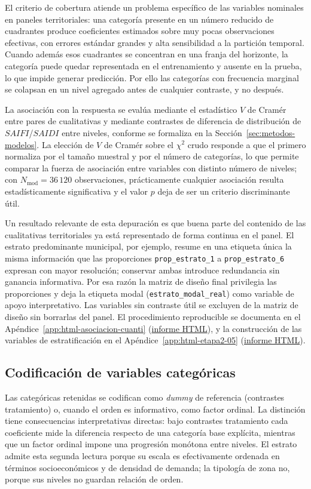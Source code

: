 El criterio de cobertura atiende un problema específico de las variables nominales en paneles territoriales: una categoría presente en un número reducido de cuadrantes produce coeficientes estimados sobre muy pocas observaciones efectivas, con errores estándar grandes y alta sensibilidad a la partición temporal. Cuando además esos cuadrantes se concentran en una franja del horizonte, la categoría puede quedar representada en el entrenamiento y ausente en la prueba, lo que impide generar predicción. Por ello las categorías con frecuencia marginal se colapsan en un nivel agregado antes de cualquier contraste, y no después.

La asociación con la respuesta se evalúa mediante el estadístico $V$ de Cramér entre pares de cualitativas y mediante contrastes de diferencia de distribución de $SAIFI$/$SAIDI$ entre niveles, conforme se formaliza en la Sección~\ref{sec:metodos-modelos}. La elección de $V$ de Cramér sobre el $\chi^2$ crudo responde a que el primero normaliza por el tamaño muestral y por el número de categorías, lo que permite comparar la fuerza de asociación entre variables con distinto número de niveles; con $N_{\mathrm{mod}}=36\,120$ observaciones, prácticamente cualquier asociación resulta estadísticamente significativa y el valor $p$ deja de ser un criterio discriminante útil.

Un resultado relevante de esta depuración es que buena parte del contenido de las cualitativas territoriales ya está representado de forma continua en el panel. El estrato predominante municipal, por ejemplo, resume en una etiqueta única la misma información que las proporciones \texttt{prop\_estrato\_1} a \texttt{prop\_estrato\_6} expresan con mayor resolución; conservar ambas introduce redundancia sin ganancia informativa. Por esa razón la matriz de diseño final privilegia las proporciones y deja la etiqueta modal (\texttt{estrato\_modal\_real}) como variable de apoyo interpretativo. Las variables sin contraste útil se excluyen de la matriz de diseño sin borrarlas del panel. El procedimiento reproducible se documenta en el Apéndice~\ref{app:html-asociacion-cuanti} (\href{\urlasociaciondepuracioncuanti}{informe HTML}), y la construcción de las variables de estratificación en el Apéndice~\ref{app:html-etapa2-05} (\href{\urlEtapaDosCinco}{informe HTML}).

\subsection{Codificación de variables categóricas}
\label{sec:codificacion_categoricas}
Las categóricas retenidas se codifican como \emph{dummy} de referencia (contrastes tratamiento) o, cuando el orden es informativo, como factor ordinal. La distinción tiene consecuencias interpretativas directas: bajo contrastes tratamiento cada coeficiente mide la diferencia respecto de una categoría base explícita, mientras que un factor ordinal impone una progresión monótona entre niveles. El estrato admite esta segunda lectura porque su escala es efectivamente ordenada en términos socioeconómicos y de densidad de demanda; la tipología de zona no, porque sus niveles no guardan relación de orden.

